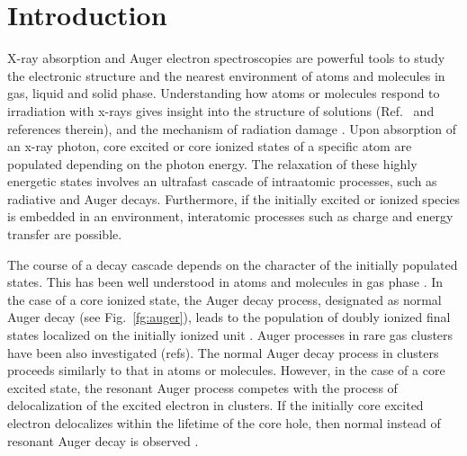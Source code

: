 \section{Introduction}

X-ray absorption and Auger electron spectroscopies are powerful tools to study the electronic structure and the nearest environment of atoms and molecules in gas, liquid and solid phase. Understanding how atoms or molecules respond to irradiation with x-rays gives insight into the structure of solutions (Ref.\ \citep{smith17:13909} and references therein), and the mechanism of radiation damage \citep{ONeill02:329,Carugo05:213,Stumpf16:237}. Upon absorption of an x-ray photon, core excited or core ionized states of a specific atom are populated depending on the photon energy. The relaxation of these highly energetic states involves an ultrafast cascade of intraatomic processes, such as radiative and Auger decays. Furthermore, if the initially excited or ionized species is embedded in an environment, interatomic processes such as charge and energy transfer \citep{Pokapanich09:7264,Pokapanich11:13430,Stumpf16:237,unger17:708,ceolin17:263003} are possible.


The course of a decay cascade depends on the character of the initially populated states. This has been well understood in atoms and molecules in gas phase  \citep{stoychev08:074307,Demekhin08:043421,Demekhin09:104303,Ouchi11:053415,Miteva14:164303,travnikova16:213001}. In the case of a core ionized state, the Auger decay process, designated as normal Auger decay (see Fig.\ \ref{fg:auger}), leads to the population of doubly ionized final states localized on the initially ionized unit {\color{red}\citep{stoychev08:074307,Demekhin08:043421,Demekhin09:104303,Ouchi11:053415}}. Auger processes in rare gas clusters have been also investigated (refs). The normal Auger decay process in clusters proceeds similarly to that in atoms or molecules. However, in the case of a core excited state, the resonant Auger process competes with the process of delocalization of the excited electron in clusters. If the initially core excited electron delocalizes within the lifetime of the core hole, then normal instead of resonant Auger decay is observed \citep{Bjorneholm95:3017}. 



